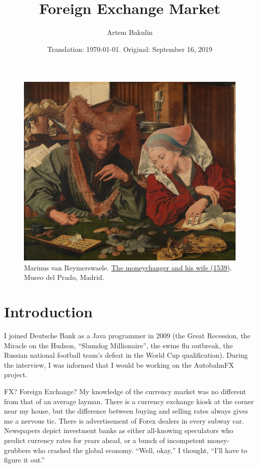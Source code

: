 \documentclass[a4paper,14pt]{extarticle}
\author{Artem Bakulin}
\date{Translation: \today. Original: September 16, 2019}
\title{Foreign Exchange Market}
\begin{document}
\maketitle
\thispagestyle{empty}

\begin{figure}[h]
\centering
\includegraphics[width=\textwidth]{../moneychanger_and_his_wife.jpg}
\captionsetup{labelformat=empty}
\caption{\footnotesize{
Marinus van Reymerswaele. \href{https://commons.wikimedia.org/wiki/File:Marinus_Claesz._van_Reymerswaele_001.jpg}{The moneychanger and his wife (1539)}. Museo del Prado, Madrid.
}}
\end{figure}
\newpage

\section*{Introduction}

I joined  Deutsche Bank as a Java programmer in 2009 (the
Great Recession, the Miracle on the Hudson, ``Slumdog Millionaire'', the swine 
flu outbreak, the Russian national football team's defeat in the World Cup 
qualification). During the interview, I was informed that I would be working on 
the AutobahnFX project.

FX? Foreign Exchange? My knowledge of the currency market was no different from 
that of an average layman. There is a currency exchange kiosk at the corner near 
my house, but the difference between buying and selling rates always gives me
a nervous tic. There is advertisement of Forex dealers in every subway car. 
Newspapers depict investment banks as either all-knowing speculators who 
predict currency rates for years ahead, or a bunch of incompetent money-grubbers 
who crashed the global economy. ``Well, okay,'' I thought, ``I'll have to figure 
it out.''
\end{document}
